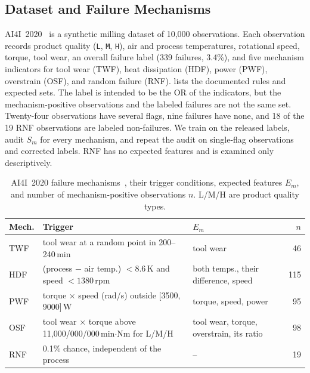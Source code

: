 \documentclass[conference]{IEEEtran}
\begin{document}
\subsection{Dataset and Failure Mechanisms}
\label{sec:data}

AI4I~2020~\cite{matzka2020explainable} is a synthetic milling dataset of 10{,}000 observations. Each observation records product quality (\texttt{L}, \texttt{M}, \texttt{H}), air and process temperatures, rotational speed, torque, tool wear, an overall failure label (339 failures, 3.4\%), and five mechanism indicators for tool wear (TWF), heat dissipation (HDF), power (PWF), overstrain (OSF), and random failure (RNF).  lists the documented rules and expected sets. The label is intended to be the OR of the indicators, but the mechanism-positive observations and the labeled failures are not the same set. Twenty-four observations have several flags, nine failures have none, and 18 of the 19 RNF observations are labeled non-failures. We train on the released labels, audit $S_m$ for every mechanism, and repeat the audit on single-flag observations and corrected labels. RNF has no expected features and is examined only descriptively.

\begin{table}[t]
\centering
\caption{AI4I~2020 failure mechanisms~\cite{matzka2020explainable},
their trigger conditions, expected features $E_m$, and number of
mechanism-positive observations $n$. L/M/H are product quality types.}
\label{tab:mechanisms}
\footnotesize
\setlength{\tabcolsep}{3pt}
\begin{tabular}{@{}lL{3.4cm}L{2.9cm}r@{}}
\toprule
Mech. & Trigger & $E_m$ & $n$ \\
\midrule
TWF & tool wear at a random point in 200--240\,min
& tool wear & 46 \\
HDF & (process $-$ air temp.) $<8.6$\,K and
speed $<1380$\,rpm
& both temps., their difference, speed & 115 \\
PWF & torque $\times$ speed (rad/s) outside
[3500, 9000]\,W
& torque, speed, power & 95 \\
OSF & tool wear $\times$ torque above
11{,}000/000/000\,min$\cdot$Nm for L/M/H
& tool wear, torque, overstrain, its ratio & 98 \\
RNF & 0.1\% chance, independent of the process
& -- & 19 \\
\bottomrule
\end{tabular}
\end{table}
\end{document}
